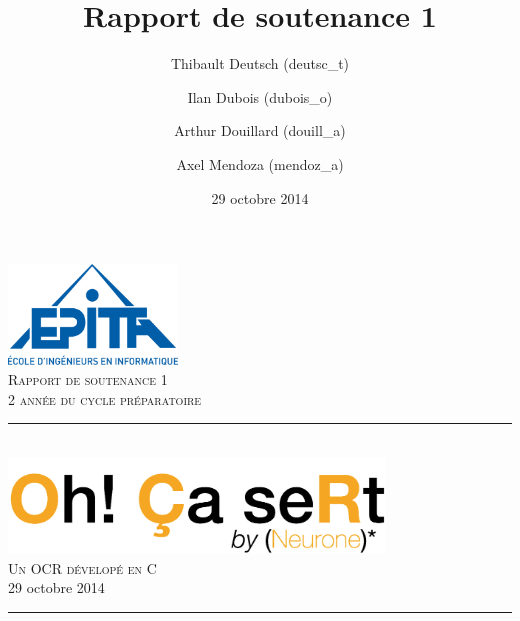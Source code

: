 \documentclass[11pt]{report}
\title{Rapport de soutenance 1}
\author{Thibault Deutsch (deutsc\_t) \and Ilan Dubois (dubois\_o) \and Arthur Douillard (douill\_a) \and Axel Mendoza (mendoz\_a)}
\date{29 octobre 2014}
\begin{document}
\renewcommand{\labelitemi}{$\bullet$}

\begin{titlepage}
\newcommand{\HRule}{\rule{\linewidth}{0.5mm}} %

\flushright
\includegraphics[width = 4.5cm]{epita.png}\\[0.5cm] %

\textsc{\Large Rapport de soutenance 1}\\[0.15cm] %
\textsc{\large 2 année du cycle préparatoire}\\[3cm] %

\center
\HRule \\[0.5cm]
\includegraphics[width = 10cm]{logo.png}\\[1cm]
\textsc{\Large Un OCR dévelopé en C}\\[0.1cm]
\large 29 octobre 2014\\[0.1cm]
\HRule \\[3cm]


\end{titlepage}
\end{document}
